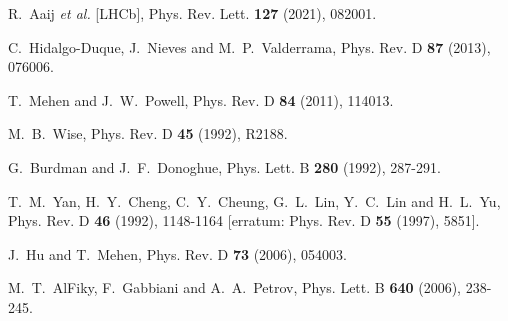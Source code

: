 \documentclass[preprint,12pt,3p]{elsarticle}
\begin{document}
\begin{thebibliography}{99}
R.~Aaij \textit{et al.} [LHCb],
Phys. Rev. Lett. \textbf{127} (2021), 082001.

C.~Hidalgo-Duque, J.~Nieves and M.~P.~Valderrama,
Phys. Rev. D \textbf{87} (2013), 076006.

T.~Mehen and J.~W.~Powell,
Phys. Rev. D \textbf{84} (2011), 114013.

M.~B.~Wise,
Phys. Rev. D \textbf{45} (1992), R2188.

G.~Burdman and J.~F.~Donoghue,
Phys. Lett. B \textbf{280} (1992), 287-291.

T.~M.~Yan, H.~Y.~Cheng, C.~Y.~Cheung, G.~L.~Lin, Y.~C.~Lin and H.~L.~Yu,
Phys. Rev. D \textbf{46} (1992), 1148-1164
[erratum: Phys. Rev. D \textbf{55} (1997), 5851].

J.~Hu and T.~Mehen,
Phys. Rev. D \textbf{73} (2006), 054003.

M.~T.~AlFiky, F.~Gabbiani and A.~A.~Petrov,
Phys. Lett. B \textbf{640} (2006), 238-245.


\end{thebibliography}
\end{document}
